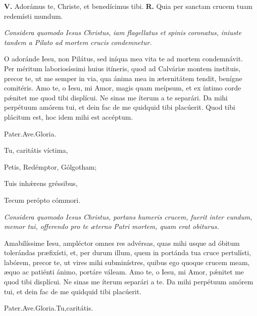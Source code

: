 \documentclass[12pt,a6paper]{book}
\newcommand{\V}{\textbf{V.} }
\newcommand{\R}{\textbf{R.} }
\newcommand{\officiumtitle}[1]{\subsection*{\parbox{\linewidth}{\centering\textbf{\textit{#1}}}}}
\newcommand{\centeredtext}[1]{\parbox{\linewidth}{\centering\textit{#1}}}
\begin{document}
\begin{sloppy}
\begin{samepage}
\V Adorámus te, Christe, et benedícimus tibi.
\R Quia per sanctam crucem tuam redemísti mundum.
\end{samepage}

\textit{Considera quomodo Iesus Christus, iam flagellatus et spinis coronatus, iniuste tandem a Pilato ad mortem crucis condemnetur.}

O adoránde Iesu, non Pilátus, sed iníqua mea vita te ad mortem condemnávit. Per méritum laboriosíssimi huius itíneris, quod ad Calváriæ montem instítuis, precor te, ut me semper in via, qua ánima mea in æternitátem tendit, benígne comitéris. Amo te, o Iesu, mi Amor, magis quam meípsum, et ex íntimo corde pǽnitet me quod tibi displícui. Ne sinas me íterum a te separári. Da mihi perpétuum amórem tui, et dein fac de me quidquid tibi placúerit. Quod tibi plácitum est, hoc idem mihi est accéptum.

Pater.Ave.Gloria.

\vspace{3mm}

Tu, caritátis víctima,

Petis, Redémptor, Gólgotham;

Tuis inhǽrens gréssibus,

Tecum perópto cómmori.


\textit{Considera quomodo Iesus Christus, portans humeris crucem, fuerit inter eundum, memor tui, offerendo pro te æterno Patri mortem, quam erat obiturus.}

Amabilíssime Iesu, ampléctor omnes res advérsas, quas mihi usque ad óbitum tolerándas præfixísti, et, per durum illum, quem in portánda tua cruce pertulísti, labórem, precor te, ut vires mihi subminístres, quibus ego quoque crucem meam, æquo ac patiénti ánimo, portáre váleam. Amo te, o Iesu, mi Amor, pǽnitet me quod tibi displícui. Ne sinas me íterum separári a te. Da mihi perpétuum amórem tui, et dein fac de me quidquid tibi placúerit.

Pater.Ave.Gloria.Tu,caritátis.


\end{sloppy}
\end{document}
